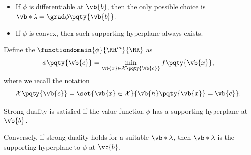 \begin{remarks}
    \begin{itemize}
        \item If \(\phi\) is differentiable at \(\vb{b}\), then the only possible choice is \(\vb*{\lambda} = \grad \phi \pqty{\vb{b}}\).
        \item If \(\phi\) is convex, then such supporting hyperplane always exists.
    \end{itemize}
\end{remarks}

\begin{definition}
    Define the  \(\functiondomain{\phi}{\RR^m}{\RR}\) as
    \[
        \phi\pqty{\vb{c}} = \min_{\vb{x} \in \mathcal{X} \pqty{\vb{c}}} f\pqty{\vb{x}},
    \]
    where we recall the notation
    \[
        \mathcal{X} \pqty{\vb{c}} = \set{\vb{x} \in \mathcal{X}}{\vb{h}\pqty{\vb{x}} = \vb{c}}.
    \]
\end{definition}

\begin{theorem}
    Strong duality is satisfied if the value function \(\phi\) has a supporting hyperplane at \(\vb{b}\).

    Conversely, if strong duality holds for a suitable \(\vb*{\lambda}\), then \(\vb*{\lambda}\) is the supporting hyperplane to \(\phi\) at \(\vb{b}\).
\end{theorem}

